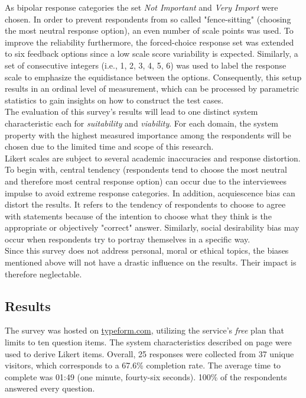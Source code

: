 As bipolar response categories the set \textit{Not Important} and \textit{Very Import} were chosen. In order to prevent respondents from so called "fence-sitting" (choosing the most neutral response option), an even number of scale points was used. To improve the reliability furthermore, the forced-choice response set was extended to six feedback options since a low scale score variability is expected.\autocite{Brill2008LikertScale} Similarly, a set of consecutive integers (i.e., 1, 2, 3, 4, 5, 6) was used to label the response scale to emphasize the equidistance between the options. Consequently, this setup results in an ordinal level of measurement, which can be processed by parametric statistics to gain insights on how to construct the test cases. \\
The evaluation of this survey's results will lead to one distinct system characteristic each for \textit{suitability} and \textit{viability}. For each domain, the system property with the highest measured importance among the respondents will be chosen due to the limited time and scope of this research. \\
Likert scales are subject to several academic inaccuracies and response distortion. To begin with, central tendency (respondents tend to choose the most neutral and therefore most central response option\autocite{Schumacker2013CentralDispersion}) can occur due to the interviewees impulse to avoid extreme response categories. In addition, acquiescence bias can distort the results. It refers to the tendency of respondents to choose to agree with statements because of the intention to choose what they think is the appropriate or objectively "correct" answer.\autocite{Costello2015AcquiescenceEducation}\highcomma\autocite{Aichholzer2015ControllingTests} Similarly, social desirability bias may occur when respondents try to portray themselves in a specific way.\autocite{Grimm2010SocialBias} \\
Since this survey does not address personal, moral or ethical topics, the biases mentioned above will not have a drastic influence on the results. Their impact is therefore neglectable. 


\subsection{Results}

The survey was hosted on \url{typeform.com}, utilizing the service's \textit{free} plan that limits to ten question items. The system characteristics described on page \pageref{lst:surveyItems} were used to derive Likert items. 
Overall,
25 responses were collected from
37 unique visitors, which corresponds to a
67.6\% completion rate. The average time to complete was 
01:49 (one minute, fourty-six seconds).
100\% of the respondents answered every question.

